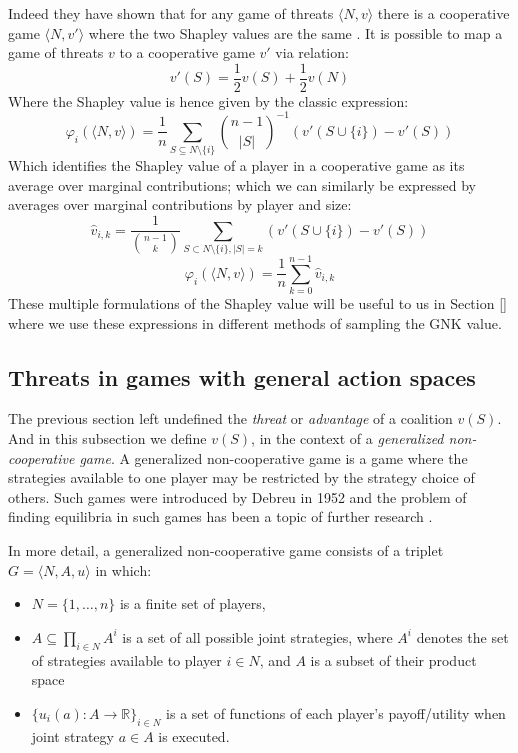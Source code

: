 Indeed they have shown that for any game of threats $\langle N,v\rangle$ there is a cooperative game $\langle N,v'\rangle$ where the two Shapley values are the same \cite{KOHLBERG2018139}.
It is possible to map a game of threats $v$ to a cooperative game $v'$ via relation:
\begin{equation}\label{convert1}
v'(S)=\frac{1}{2}v(S)+\frac{1}{2}v(N)
\end{equation}
Where the Shapley value is hence given by the classic expression:
\begin{equation}\label{eq:shapley_value}
    \varphi_i(\langle N,v\rangle)= \frac{1}{n}\sum_{S\subseteq N\setminus\{i\}} \binom{n-1}{|S|}^{-1} \left(v'(S\cup\{i\})-v'(S)\right) 
\end{equation}
Which identifies the Shapley value of a player in a cooperative game as its average over marginal contributions; which we can similarly be expressed by averages over marginal contributions by player and size:
\begin{equation}\label{eq:shapley_value2}
\hat{v}_{i,k} = \frac{1}{\binom{n-1}{k}}\sum_{S\subset N\setminus \{ i\} , |S|=k} %
(v'(S\cup\{i\})-v'(S))
\end{equation}
\begin{equation}\label{shap2} \varphi_i(\langle N,v\rangle) = \frac{1}{n}\sum_{k=0}^{n-1}\hat{v}_{i,k} \end{equation}
These multiple formulations of the Shapley value will be useful to us in Section \ref{} where we use these expressions in different methods of sampling the GNK value.


\subsection{Threats in games with general action spaces}\label{the_value_def3}
The previous section left undefined the \emph{threat} or \emph{advantage} of a coalition $v(S)$.
And in this subsection we define $v(S)$, in the context of a \textit{generalized non-cooperative game}.
A generalized non-cooperative game is a game where the strategies available to one player may be restricted by the strategy choice of others.
Such games were introduced by Debreu in 1952 \cite{Debreu01101952} and the problem of finding equilibria in such games has been a topic of further research \cite{Facchinei2007,fischer2014,DutangSurvey}.

In more detail, a generalized non-cooperative game consists of a triplet $G = \langle N,A,u \rangle$ in which:
\begin{itemize}
\item	$N=\{1,\dots,n\}$ is a finite set of players,
\item	$A\subseteq \prod_{i\in N}A^i$ is a set of all possible joint strategies, where $A^i$ denotes the set of strategies available to player $i\in N$, and $A$ is a subset of their product space
\item	$\{u_i(a) : A\rightarrow \mathbb{R}\}_{i\in N}$ is a set of functions of each player's payoff/utility when joint strategy $a\in A$ is executed.
\end{itemize}

